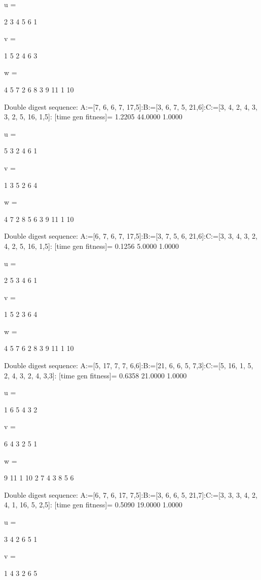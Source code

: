 u =

     2     3     4     5     6     1


v =

     1     5     2     4     6     3


w =

     4     5     7     2     6     8     3     9    11     1    10

Double digest sequence:
A:=[7, 6, 6, 7, 17,5]:B:=[3, 6, 7, 5, 21,6]:C:=[3, 4, 2, 4, 3, 3, 2, 5, 16, 1,5]:
[time gen fitness]=
    1.2205   44.0000    1.0000


u =

     5     3     2     4     6     1


v =

     1     3     5     2     6     4


w =

     4     7     2     8     5     6     3     9    11     1    10

Double digest sequence:
A:=[6, 7, 6, 7, 17,5]:B:=[3, 7, 5, 6, 21,6]:C:=[3, 3, 4, 3, 2, 4, 2, 5, 16, 1,5]:
[time gen fitness]=
    0.1256    5.0000    1.0000


u =

     2     5     3     4     6     1


v =

     1     5     2     3     6     4


w =

     4     5     7     6     2     8     3     9    11     1    10

Double digest sequence:
A:=[5, 17, 7, 7, 6,6]:B:=[21, 6, 6, 5, 7,3]:C:=[5, 16, 1, 5, 2, 4, 3, 2, 4, 3,3]:
[time gen fitness]=
    0.6358   21.0000    1.0000


u =

     1     6     5     4     3     2


v =

     6     4     3     2     5     1


w =

     9    11     1    10     2     7     4     3     8     5     6

Double digest sequence:
A:=[6, 7, 6, 17, 7,5]:B:=[3, 6, 6, 5, 21,7]:C:=[3, 3, 3, 4, 2, 4, 1, 16, 5, 2,5]:
[time gen fitness]=
    0.5090   19.0000    1.0000


u =

     3     4     2     6     5     1


v =

     1     4     3     2     6     5


